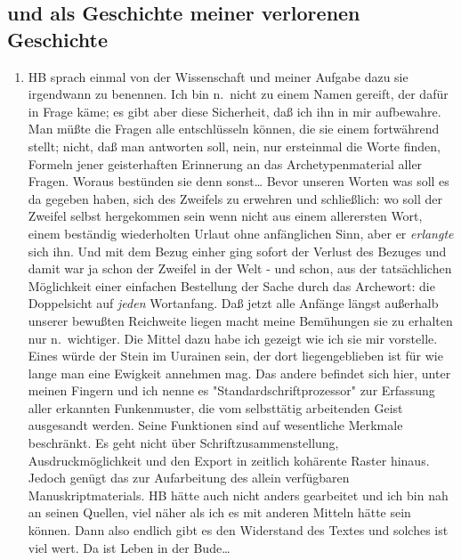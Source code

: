 \documentclass[
]{article}
\author{}
\date{\vspace{-2.5em}}
\providecommand{\tightlist}{%
  \setlength{\itemsep}{0pt}\setlength{\parskip}{0pt}}
\begin{document}
\subsection{und als Geschichte meiner verlorenen
Geschichte}\label{und-als-geschichte-meiner-verlorenen-geschichte}

\begin{enumerate}
\def\labelenumi{\alph{enumi}.}
\setcounter{enumi}{1}
\tightlist
\item
  HB sprach einmal von der Wissenschaft und meiner Aufgabe dazu sie
  irgendwann zu benennen. Ich bin n.~nicht zu einem Namen gereift, der
  dafür in Frage käme; es gibt aber diese Sicherheit, daß ich ihn in mir
  aufbewahre. Man müßte die Fragen alle entschlüsseln können, die sie
  einem fortwährend stellt; nicht, daß man antworten soll, nein, nur
  ersteinmal die Worte finden, Formeln jener geisterhaften Erinnerung an
  das Archetypenmaterial aller Fragen. Woraus bestünden sie denn
  sonst\ldots{} Bevor unseren Worten was soll es da gegeben haben, sich
  des Zweifels zu erwehren und schließlich: wo soll der Zweifel selbst
  hergekommen sein wenn nicht aus einem allerersten Wort, einem
  beständig wiederholten Urlaut ohne anfänglichen Sinn, aber er
  \emph{erlangte} sich ihn. Und mit dem Bezug einher ging sofort der
  Verlust des Bezuges und damit war ja schon der Zweifel in der Welt -
  und schon, aus der tatsächlichen Möglichkeit einer einfachen
  Bestellung der Sache durch das Archewort: die Doppelsicht auf
  \emph{jeden} Wortanfang. Daß jetzt alle Anfänge längst außerhalb
  unserer bewußten Reichweite liegen macht meine Bemühungen sie zu
  erhalten nur n.~wichtiger. Die Mittel dazu habe ich gezeigt wie ich
  sie mir vorstelle. Eines würde der Stein im Uurainen sein, der dort
  liegengeblieben ist für wie lange man eine Ewigkeit annehmen mag. Das
  andere befindet sich hier, unter meinen Fingern und ich nenne es
  "Standardschriftprozessor" zur Erfassung aller erkannten Funkenmuster,
  die vom selbsttätig arbeitenden Geist ausgesandt werden. Seine
  Funktionen sind auf wesentliche Merkmale beschränkt. Es geht nicht
  über Schriftzusammenstellung, Ausdruckmöglichkeit und den Export in
  zeitlich kohärente Raster hinaus. Jedoch genügt das zur Aufarbeitung
  des allein verfügbaren Manuskriptmaterials. HB hätte auch nicht anders
  gearbeitet und ich bin nah an seinen Quellen, viel näher als ich es
  mit anderen Mitteln hätte sein können. Dann also endlich gibt es den
  Widerstand des Textes und solches ist viel wert. Da ist Leben in der
  Bude\ldots{}
\end{enumerate}
\end{document}
